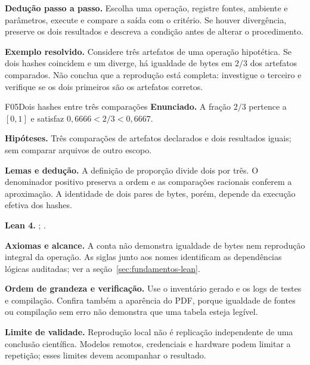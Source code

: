 \begin{metodo}
\textbf{Dedução passo a passo.} Escolha uma operação, registre fontes, ambiente e parâmetros, execute e compare a saída com o critério. Se houver divergência, preserve os dois resultados e descreva a condição antes de alterar o procedimento.
\end{metodo}

\begin{resultado}
\textbf{Exemplo resolvido.} Considere três artefatos de uma operação hipotética. Se dois hashes coincidem e um diverge, há igualdade de bytes em $2/3$ dos artefatos comparados. Não conclua que a reprodução está completa: investigue o terceiro e verifique se os dois primeiros são os artefatos corretos.
\end{resultado}
\begin{formalizacao}{F05}{Dois hashes entre três comparações}
\textbf{Enunciado.} A fração $2/3$ pertence a $[0,1]$ e satisfaz $0{,}6666<2/3<0{,}6667$.

\textbf{Hipóteses.} Três comparações de artefatos declarados e dois resultados iguais; sem comparar arquivos de outro escopo.

\textbf{Lemas e dedução.} A definição de proporção divide dois por três. O denominador positivo preserva a ordem e as comparações racionais conferem a aproximação. A identidade de dois pares de bytes, porém, depende da execução efetiva dos hashes.

\textbf{Lean 4.} ; .

\textbf{Axiomas e alcance.} A conta não demonstra igualdade de bytes nem reprodução integral da operação. As siglas junto aos nomes identificam as dependências lógicas auditadas; ver a seção~\ref{sec:fundamentos-lean}.
\end{formalizacao}


\begin{resultado}
\textbf{Ordem de grandeza e verificação.} Use o inventário gerado e os logs de testes e compilação. Confira também a aparência do PDF, porque igualdade de fontes ou compilação sem erro não demonstra que uma tabela esteja legível.
\end{resultado}

\begin{aviso}
\textbf{Limite de validade.} Reprodução local não é replicação independente de uma conclusão científica. Modelos remotos, credenciais e hardware podem limitar a repetição; esses limites devem acompanhar o resultado.
\end{aviso}

